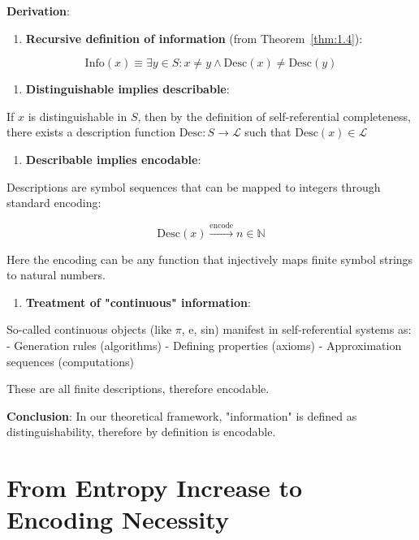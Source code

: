 \textbf{Derivation}:

\begin{enumerate}
\item \textbf{Recursive definition of information} (from Theorem~\ref{thm:1.4}):
\end{enumerate}
   
\begin{equation}
\text{Info}(x) \equiv \exists y \in S: x \neq y \land \text{Desc}(x) \neq \text{Desc}(y)
\end{equation}

\begin{enumerate}
\item \textbf{Distinguishable implies describable}:
\end{enumerate}
   If $x$ is distinguishable in $S$, then by the definition of self-referential completeness,
   there exists a description function $\text{Desc}: S \to \mathcal{L}$ such that $\text{Desc}(x) \in \mathcal{L}$

\begin{enumerate}
\item \textbf{Describable implies encodable}:
\end{enumerate}
   Descriptions are symbol sequences that can be mapped to integers through standard encoding:
   
\begin{equation}
\text{Desc}(x) \xrightarrow{\text{encode}} n \in \mathbb{N}
\end{equation}
   
   Here the encoding can be any function that injectively maps finite symbol strings to natural numbers.

\begin{enumerate}
\item \textbf{Treatment of "continuous" information}:
\end{enumerate}
   So-called continuous objects (like $\pi$, e, sin) manifest in self-referential systems as:
   - Generation rules (algorithms)
   - Defining properties (axioms)
   - Approximation sequences (computations)
   
   These are all finite descriptions, therefore encodable.

\textbf{Conclusion}: In our theoretical framework, "information" is defined as distinguishability, therefore by definition is encodable.

\section{From Entropy Increase to Encoding Necessity}
\label{sec:ch02_encoding:from-entropy-increase-to-encoding-necessity}

